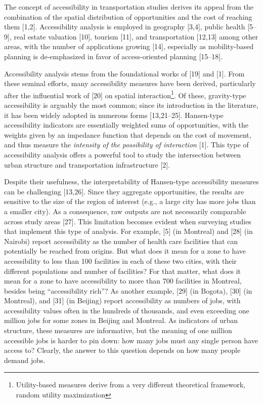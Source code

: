 \documentclass[10pt,letterpaper]{article}
\begin{document}
The concept of accessibility in transportation studies derives its
appeal from the combination of the spatial distribution of opportunities
and the cost of reaching them {[}1,2{]}. Accessibility analysis is
employed in geography {[}3,4{]}, public health {[}5--9{]}, real estate
valuation {[}10{]}, tourism {[}11{]}, and transportation {[}12,13{]}
among other areas, with the number of applications growing {[}14{]},
especially as mobility-based planning is de-emphasized in favor of
access-oriented planning {[}15--18{]}.

Accessibility analysis stems from the foundational works of {[}19{]} and
{[}1{]}. From these seminal efforts, many accessibility measures have
been derived, particularly after the influential work of {[}20{]} on
spatial interaction\footnote{Utility-based measures derive from a very
  different theoretical framework, random utility maximization}. Of
these, gravity-type accessibility is arguably the most common; since its
introduction in the literature, it has been widely adopted in numerous
forms {[}13,21--25{]}. Hansen-type accessibility indicators are
essentially weighted sums of opportunities, with the weights given by an
impedance function that depends on the cost of movement, and thus
measure the \emph{intensity of the possibility of interaction} {[}1{]}.
This type of accessibility analysis offers a powerful tool to study the
intersection between urban structure and transportation infrastructure
{[}2{]}.

Despite their usefulness, the interpretability of Hansen-type
accessibility measures can be challenging {[}13,26{]}. Since they
aggregate opportunities, the results are sensitive to the size of the
region of interest (e.g., a large city has more jobs than a smaller
city). As a consequence, raw outputs are not necessarily comparable
across study areas {[}27{]}. This limitation becomes evident when
surveying studies that implement this type of analysis. For example,
{[}5{]} (in Montreal) and {[}28{]} (in Nairobi) report accessibility as
the number of health care facilities that can potentially be reached
from origins. But what does it mean for a zone to have accessibility to
less than 100 facilities in each of these two cities, with their
different populations and number of facilities? For that matter, what
does it mean for a zone to have accessibility to more than 700
facilities in Montreal, besides being ``accessibility rich''? As another
example, {[}29{]} (in Bogota), {[}30{]} (in Montreal), and {[}31{]} (in
Beijing) report accessibility as numbers of jobs, with accessibility
values often in the hundreds of thousands, and even exceeding one
million jobs for some zones in Beijing and Montreal. As indicators of
urban structure, these measures are informative, but the meaning of one
million accessible jobs is harder to pin down: how many jobs must any
single person have access to? Clearly, the answer to this question
depends on how many people demand jobs.
\end{document}
